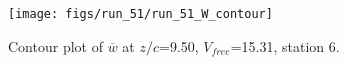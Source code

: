 \begin{figure}[H]
\centering
\texttt{[image: figs/run\_51/run\_51\_W\_contour]}
\caption{Contour plot of $\overline{w}$ at $z/c$=9.50, $V_{free}$=15.31, station 6.}
\label{fig:run_51_W_contour}
\end{figure}


